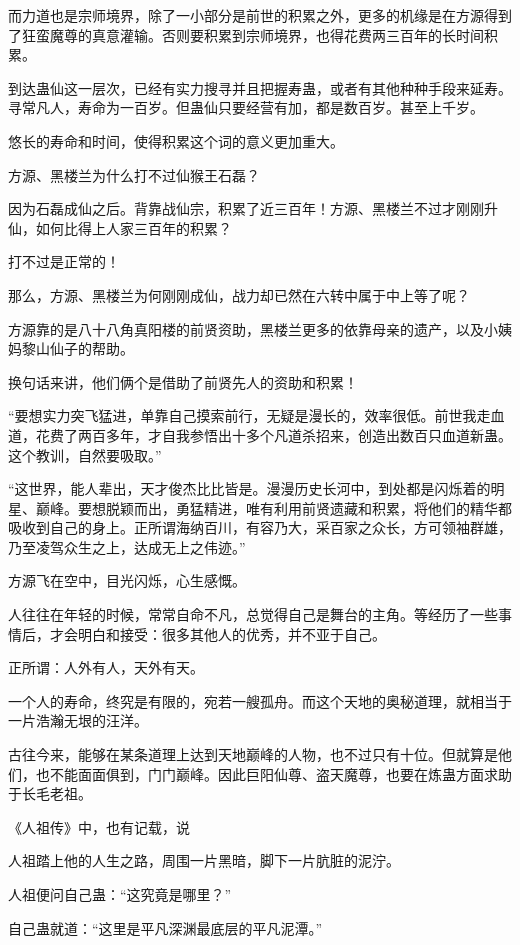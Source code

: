 \begin{this_body}
而力道也是宗师境界，除了一小部分是前世的积累之外，更多的机缘是在方源得到了狂蛮魔尊的真意灌输。否则要积累到宗师境界，也得花费两三百年的长时间积累。

到达蛊仙这一层次，已经有实力搜寻并且把握寿蛊，或者有其他种种手段来延寿。寻常凡人，寿命为一百岁。但蛊仙只要经营有加，都是数百岁。甚至上千岁。

悠长的寿命和时间，使得积累这个词的意义更加重大。

方源、黑楼兰为什么打不过仙猴王石磊？

因为石磊成仙之后。背靠战仙宗，积累了近三百年！方源、黑楼兰不过才刚刚升仙，如何比得上人家三百年的积累？

打不过是正常的！

那么，方源、黑楼兰为何刚刚成仙，战力却已然在六转中属于中上等了呢？

方源靠的是八十八角真阳楼的前贤资助，黑楼兰更多的依靠母亲的遗产，以及小姨妈黎山仙子的帮助。

换句话来讲，他们俩个是借助了前贤先人的资助和积累！

“要想实力突飞猛进，单靠自己摸索前行，无疑是漫长的，效率很低。前世我走血道，花费了两百多年，才自我参悟出十多个凡道杀招来，创造出数百只血道新蛊。这个教训，自然要吸取。”

“这世界，能人辈出，天才俊杰比比皆是。漫漫历史长河中，到处都是闪烁着的明星、巅峰。要想脱颖而出，勇猛精进，唯有利用前贤遗藏和积累，将他们的精华都吸收到自己的身上。正所谓海纳百川，有容乃大，采百家之众长，方可领袖群雄，乃至凌驾众生之上，达成无上之伟迹。”

方源飞在空中，目光闪烁，心生感慨。

人往往在年轻的时候，常常自命不凡，总觉得自己是舞台的主角。等经历了一些事情后，才会明白和接受：很多其他人的优秀，并不亚于自己。

正所谓：人外有人，天外有天。

一个人的寿命，终究是有限的，宛若一艘孤舟。而这个天地的奥秘道理，就相当于一片浩瀚无垠的汪洋。

古往今来，能够在某条道理上达到天地巅峰的人物，也不过只有十位。但就算是他们，也不能面面俱到，门门巅峰。因此巨阳仙尊、盗天魔尊，也要在炼蛊方面求助于长毛老祖。

《人祖传》中，也有记载，说

人祖踏上他的人生之路，周围一片黑暗，脚下一片肮脏的泥泞。

人祖便问自己蛊：“这究竟是哪里？”

自己蛊就道：“这里是平凡深渊最底层的平凡泥潭。”


\end{this_body}
